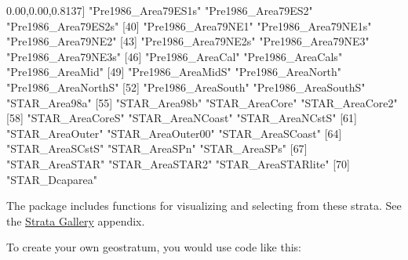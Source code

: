 \documentclass[
]{book}
\newenvironment{Shaded}{\begin{snugshade}}{\end{snugshade}}
\newcommand{\DecValTok}[1]{\textcolor[rgb]{0.00,0.00,0.81}{#1}}
\newcommand{\NormalTok}[1]{#1}
\newcommand{\StringTok}[1]{\textcolor[rgb]{0.31,0.60,0.02}{#1}}
\begin{document}
\begin{Shaded}
\begin{Highlighting}[]
\NormalTok{[}\DecValTok{37}\NormalTok{] }\StringTok{"Pre1986\_Area79ES1s"} \StringTok{"Pre1986\_Area79ES2"}  \StringTok{"Pre1986\_Area79ES2s"}
\NormalTok{[}\DecValTok{40}\NormalTok{] }\StringTok{"Pre1986\_Area79NE1"}  \StringTok{"Pre1986\_Area79NE1s"} \StringTok{"Pre1986\_Area79NE2"} 
\NormalTok{[}\DecValTok{43}\NormalTok{] }\StringTok{"Pre1986\_Area79NE2s"} \StringTok{"Pre1986\_Area79NE3"}  \StringTok{"Pre1986\_Area79NE3s"}
\NormalTok{[}\DecValTok{46}\NormalTok{] }\StringTok{"Pre1986\_AreaCal"}    \StringTok{"Pre1986\_AreaCals"}   \StringTok{"Pre1986\_AreaMid"}   
\NormalTok{[}\DecValTok{49}\NormalTok{] }\StringTok{"Pre1986\_AreaMidS"}   \StringTok{"Pre1986\_AreaNorth"}  \StringTok{"Pre1986\_AreaNorthS"}
\NormalTok{[}\DecValTok{52}\NormalTok{] }\StringTok{"Pre1986\_AreaSouth"}  \StringTok{"Pre1986\_AreaSouthS"} \StringTok{"STAR\_Area98a"}      
\NormalTok{[}\DecValTok{55}\NormalTok{] }\StringTok{"STAR\_Area98b"}       \StringTok{"STAR\_AreaCore"}      \StringTok{"STAR\_AreaCore2"}    
\NormalTok{[}\DecValTok{58}\NormalTok{] }\StringTok{"STAR\_AreaCoreS"}     \StringTok{"STAR\_AreaNCoast"}    \StringTok{"STAR\_AreaNCstS"}    
\NormalTok{[}\DecValTok{61}\NormalTok{] }\StringTok{"STAR\_AreaOuter"}     \StringTok{"STAR\_AreaOuter00"}   \StringTok{"STAR\_AreaSCoast"}   
\NormalTok{[}\DecValTok{64}\NormalTok{] }\StringTok{"STAR\_AreaSCstS"}     \StringTok{"STAR\_AreaSPn"}       \StringTok{"STAR\_AreaSPs"}      
\NormalTok{[}\DecValTok{67}\NormalTok{] }\StringTok{"STAR\_AreaSTAR"}      \StringTok{"STAR\_AreaSTAR2"}     \StringTok{"STAR\_AreaSTARlite"} 
\NormalTok{[}\DecValTok{70}\NormalTok{] }\StringTok{"STAR\_Dcaparea"}     
\end{Highlighting}
\end{Shaded}

The package includes functions for visualizing and selecting from these strata. See the \protect\hyperlink{stratagallery}{Strata Gallery} appendix.

To create your own geostratum, you would use code like this:
\end{document}
